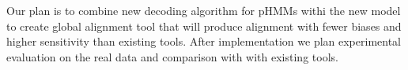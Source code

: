 %

Our plan is to combine new decoding algorithm for pHMMs withi the new model to
create global alignment tool that will produce alignment with fewer biases and
higher sensitivity than existing tools. After implementation we plan
experimental evaluation on the real data and comparison with with existing
tools.  


\label{LastPage}

